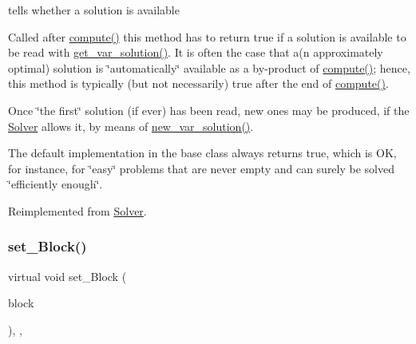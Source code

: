 tells whether a solution is available 

Called after \mbox{\hyperlink{class_s_m_spp__di__unipi__it_1_1_fake_solver_afc8ff54ab05d22f4cca0fb0bfbeb7a49}{compute()}} this method has to return true if a solution is available to be read with \mbox{\hyperlink{class_s_m_spp__di__unipi__it_1_1_fake_solver_ac83fa9679882440d13fb5940494699c5}{get\+\_\+var\+\_\+solution()}}. It is often the case that a(n approximately optimal) solution is \char`\"{}automatically\char`\"{} available as a by-\/product of \mbox{\hyperlink{class_s_m_spp__di__unipi__it_1_1_fake_solver_afc8ff54ab05d22f4cca0fb0bfbeb7a49}{compute()}}; hence, this method is typically (but not necessarily) true after the end of \mbox{\hyperlink{class_s_m_spp__di__unipi__it_1_1_fake_solver_afc8ff54ab05d22f4cca0fb0bfbeb7a49}{compute()}}.

Once \char`\"{}the first\char`\"{} solution (if ever) has been read, new ones may be produced, if the \mbox{\hyperlink{class_s_m_spp__di__unipi__it_1_1_solver}{Solver}} allows it, by means of \mbox{\hyperlink{class_s_m_spp__di__unipi__it_1_1_solver_af109b504a566c90a4ea45c1574c128fe}{new\+\_\+var\+\_\+solution()}}.

The default implementation in the base class always returns true, which is OK, for instance, for \char`\"{}easy\char`\"{} problems that are never empty and can surely be solved \char`\"{}efficiently enough\char`\"{}. 

Reimplemented from \mbox{\hyperlink{class_s_m_spp__di__unipi__it_1_1_solver_aa96263f4e0c59225f3f5d54f03fe31ee}{Solver}}.

\mbox{\label{class_s_m_spp__di__unipi__it_1_1_fake_solver_a8d7fb698416759f38941e06b23cccaec}} 
\subsubsection{\texorpdfstring{set\+\_\+\+Block()}{set\_Block()}}
{\footnotesize\ttfamily virtual void set\+\_\+\+Block (\begin{DoxyParamCaption}\item[{\mbox{\hyperlink{class_s_m_spp__di__unipi__it_1_1_block}{Block}} $\ast$}]{block }\end{DoxyParamCaption})\hspace{0.3cm}{\ttfamily [inline]}, {\ttfamily [override]}, {\ttfamily [virtual]}}



